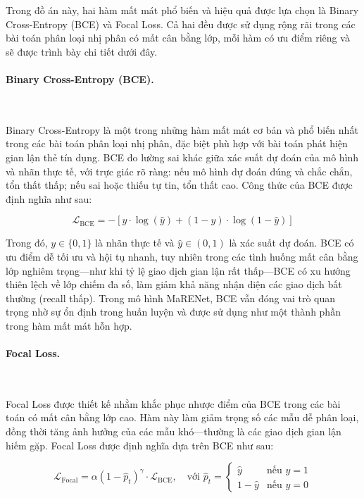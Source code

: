 Trong đồ án này, hai hàm mất mát phổ biến và hiệu quả được lựa chọn là Binary Cross-Entropy (BCE) và Focal Loss. Cả hai đều được sử dụng rộng rãi trong các bài toán phân loại nhị phân có mất cân bằng lớp, mỗi hàm có ưu điểm riêng và sẽ được trình bày chi tiết dưới đây.

\paragraph{Binary Cross-Entropy (BCE).}~

Binary Cross-Entropy là một trong những hàm mất mát cơ bản và phổ biến nhất trong các bài toán phân loại nhị phân, đặc biệt phù hợp với bài toán phát hiện gian lận thẻ tín dụng. BCE đo lường sai khác giữa xác suất dự đoán của mô hình và nhãn thực tế, với trực giác rõ ràng: nếu mô hình dự đoán đúng và chắc chắn, tổn thất thấp; nếu sai hoặc thiếu tự tin, tổn thất cao. Công thức của BCE được định nghĩa như sau:

\begin{equation}
    \mathcal{L}_{\text{BCE}} = - \left[ y \cdot \log(\hat{y}) + (1 - y) \cdot \log(1 - \hat{y}) \right]
\end{equation}

Trong đó, \( y \in \{0, 1\} \) là nhãn thực tế và \( \hat{y} \in (0, 1) \) là xác suất dự đoán. BCE có ưu điểm dễ tối ưu và hội tụ nhanh, tuy nhiên trong các tình huống mất cân bằng lớp nghiêm trọng—như khi tỷ lệ giao dịch gian lận rất thấp—BCE có xu hướng thiên lệch về lớp chiếm đa số, làm giảm khả năng nhận diện các giao dịch bất thường (recall thấp). Trong mô hình MaRENet, BCE vẫn đóng vai trò quan trọng nhờ sự ổn định trong huấn luyện và được sử dụng như một thành phần trong hàm mất mát hỗn hợp.

\paragraph{Focal Loss.}~

Focal Loss được thiết kế nhằm khắc phục nhược điểm của BCE trong các bài toán có mất cân bằng lớp cao. Hàm này làm giảm trọng số các mẫu dễ phân loại, đồng thời tăng ảnh hưởng của các mẫu khó—thường là các giao dịch gian lận hiếm gặp. Focal Loss được định nghĩa dựa trên BCE như sau:

\begin{equation}
    \mathcal{L}_{\text{Focal}} = \alpha (1 - \hat{p}_t)^\gamma \cdot \mathcal{L}_{\text{BCE}}, \quad \text{với } 
    \hat{p}_t = 
    \begin{cases}
        \hat{y} & \text{nếu } y = 1 \\
        1 - \hat{y} & \text{nếu } y = 0
    \end{cases}
\end{equation}

